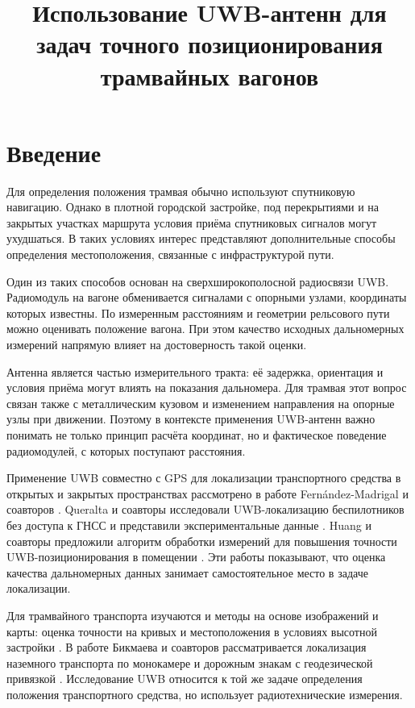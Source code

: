 \documentclass{misisarticle}
\title{Использование UWB-антенн для задач точного позиционирования трамвайных вагонов}
\begin{document}
\maketitle

\section{Введение}

Для определения положения трамвая обычно используют спутниковую навигацию. Однако в плотной городской застройке, под перекрытиями и на закрытых участках маршрута условия приёма спутниковых сигналов могут ухудшаться. В таких условиях интерес представляют дополнительные способы определения местоположения, связанные с инфраструктурой пути.

Один из таких способов основан на сверхширокополосной радиосвязи UWB. Радиомодуль на вагоне обменивается сигналами с опорными узлами, координаты которых известны. По измеренным расстояниям и геометрии рельсового пути можно оценивать положение вагона. При этом качество исходных дальномерных измерений напрямую влияет на достоверность такой оценки.

Антенна является частью измерительного тракта: её задержка, ориентация и условия приёма могут влиять на показания дальномера. Для трамвая этот вопрос связан также с металлическим кузовом и изменением направления на опорные узлы при движении. Поэтому в контексте применения UWB-антенн важно понимать не только принцип расчёта координат, но и фактическое поведение радиомодулей, с которых поступают расстояния.

Применение UWB совместно с GPS для локализации транспортного средства в открытых и закрытых пространствах рассмотрено в работе Fernández-Madrigal и соавторов \cite{fernandez2007application}. Queralta и соавторы исследовали UWB-локализацию беспилотников без доступа к ГНСС и представили экспериментальные данные \cite{queralta2020uwb}. Huang и соавторы предложили алгоритм обработки измерений для повышения точности UWB-позиционирования в помещении \cite{huang2024design}. Эти работы показывают, что оценка качества дальномерных данных занимает самостоятельное место в задаче локализации.

Для трамвайного транспорта изучаются и методы на основе изображений и карты: оценка точности на кривых \cite{ali2025} и местоположения в условиях высотной застройки \cite{guzhva2023}. В работе Бикмаева и соавторов рассматривается локализация наземного транспорта по монокамере и дорожным знакам с геодезической привязкой \cite{bikmaev2020}. Исследование UWB относится к той же задаче определения положения транспортного средства, но использует радиотехнические измерения.
\end{document}

